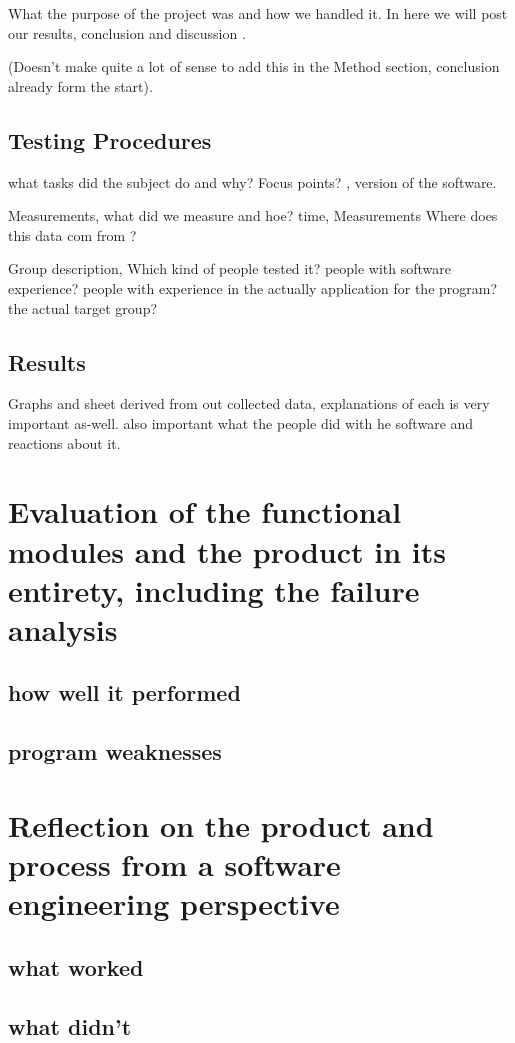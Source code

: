 \documentclass[11pt]{article}
\begin{document}
What the purpose of the project was and how we handled it.
In here we will post our results, conclusion and discussion .

(Doesn't make quite a lot of sense to add this in the Method section, conclusion already form the start).

 \subsection{Testing Procedures}
what tasks did the subject do and why?
Focus points? , version of the software.

Measurements, what did we measure and hoe?
time, Measurements
Where does this data com from ?

Group description, 
Which kind of people tested it? people with software experience?
people with experience in the actually application for the program? the actual target group?

 \subsection{Results}
 
 Graphs and sheet derived from out collected data, 
 explanations of each is very important as-well. also important what the people did with he software and reactions about it. 

\section{ Evaluation of the functional modules and the product in its entirety, including the failure analysis }
	\subsection{how well it performed}
    \subsection{program weaknesses}
    
\section{ Reflection on the product and process from a software engineering perspective }
	\subsection{what worked}
    \subsection{what didn't}
    
\end{document}

